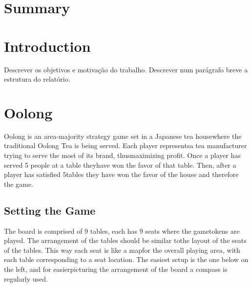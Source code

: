 \documentclass[a4paper]{article}
\begin{document}
\newpage

\section*{Summary}

\newpage

\tableofcontents



\newpage

\section{Introduction}

Descrever os objetivos e motivação do trabalho. Descrever num parágrafo breve a estrutura do relatório.


\section{Oolong}
Oolong​ ​is​ ​an​ ​area-majority​ ​strategy​ ​game​ ​set​ ​in​ ​a​ ​Japanese​ ​tea​ ​house​ ​where​ ​the​ ​traditional
Oolong​ ​Tea​​ ​is​ ​being​ ​served.​ ​Each​ ​player​ ​represents​ ​a​ ​tea​ ​manufacturer​ ​trying​ ​to​ ​serve​ ​the​ ​most
of​ ​its​ ​brand,​ ​thus​ ​maximizing​ ​profit.​ ​Once​ ​a​ ​player​ ​has​ ​served​ ​5​ ​people​ ​at​ ​a​ ​table​ ​they​ ​have​ ​won
the​ ​favor​ ​of​ ​that​ ​table.​ ​Then,​ ​after​ ​a​ ​player​ ​has​ ​satisfied​ ​5​ ​tables​ ​they​ ​have​ ​won​ ​the​ ​favor​ ​of​ ​the
house​ ​and​ ​therefore​ ​the​ ​game.

\subsection{Setting​ ​the​ ​Game}
The​ ​board​ ​is​ ​comprised​ ​of​ ​9​ ​tables,​ ​each​ ​has​ ​9​ ​seats​ ​where​ ​the​ ​game​ ​tokens​ ​are​ ​played.
The​ ​arrangement​ ​of​ ​the​ ​tables​ ​should​ ​be​ ​similar​ ​to​ ​the​ ​layout​ ​of​ ​the​ ​seats​ ​of​ ​the​ ​tables.​ ​This​ ​way
each​ ​seat​ ​is​ ​like​ ​a​ ​map​ ​for​ ​the​ ​overall​ ​playing​ ​area,​ ​with​ ​each​ ​table​ ​corresponding​ ​to​ ​a​ ​seat
location.​ ​The​ ​easiest​ ​setup​ ​is​ ​the​ ​one​ ​below​ ​on​ ​the​ ​left,​ ​and​ ​for​ ​easier​ ​picturing​ ​the​ ​arrangement
of​ ​the​ ​board​ ​a​ ​compass​ ​is​ ​regularly​ ​used.
\end{document}
